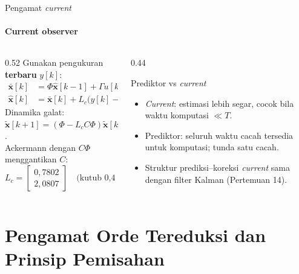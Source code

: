 \documentclass[aspectratio=169,10pt]{beamer}
\begin{document}
\begin{frame}{Pengamat \textit{current}}
	\framesubtitle{Current observer}
	\begin{columns}[T]
		\begin{column}{0.52\textwidth}
			\small
			Gunakan pengukuran \textbf{terbaru} $y[k]$:
			\begin{align*}
				\bar{\mathbf{x}}[k] &= \Phi\hat{\mathbf{x}}[k-1] + \Gamma u[k-1] & \text{(prediksi)}\\
				\hat{\mathbf{x}}[k] &= \bar{\mathbf{x}}[k] + L_c\big(y[k] - C\bar{\mathbf{x}}[k]\big) & \text{(koreksi)}
			\end{align*}
			Dinamika galat: $\tilde{\mathbf{x}}[k+1] = (\Phi - L_cC\Phi)\tilde{\mathbf{x}}[k]$.\\[3pt]
			Ackermann dengan $C\Phi$ menggantikan $C$:
			\[
				L_c = \begin{bmatrix}0{,}7802\\ 2{,}0807\end{bmatrix}\quad\text{(kutub 0,4 dan 0,45)}
			\]
		\end{column}
		\begin{column}{0.44\textwidth}
			\begin{block}{Prediktor vs \textit{current}}
				\small
				\begin{itemize}
					\item \textit{Current}: estimasi lebih segar, cocok bila waktu komputasi $\ll T$.
					\item Prediktor: seluruh waktu cacah tersedia untuk komputasi; tunda satu cacah.
					\item Struktur prediksi--koreksi \textit{current} sama dengan filter Kalman (Pertemuan 14).
				\end{itemize}
			\end{block}
		\end{column}
	\end{columns}
\end{frame}

\section{Pengamat Orde Tereduksi dan Prinsip Pemisahan\texorpdfstring{\\[4pt]{\Large{}}}{ / Reduced-Order Observers and the Separation Principle}}
\end{document}
